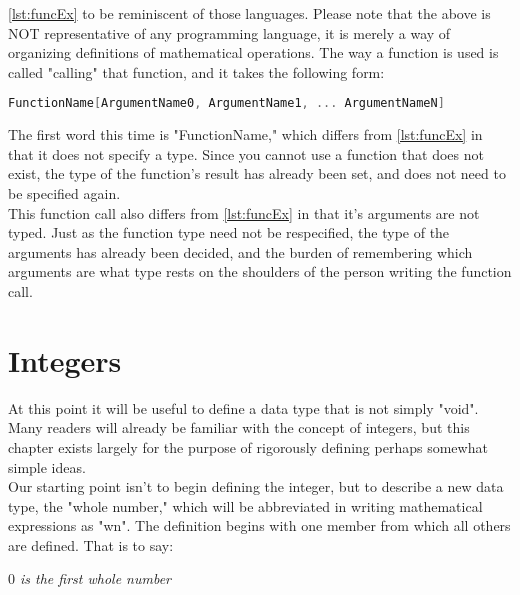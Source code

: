 \ref{lst:funcEx} to be reminiscent of those languages. Please note that the above is NOT representative of any programming language, it is merely a way of organizing definitions of mathematical operations.
The way a function is used is called "calling" that function, and it takes the following form:
\begin{center}
\begin{lstlisting}[language=C, caption=Function Call Example, label=lst:funcCallEx]
FunctionName[ArgumentName0, ArgumentName1, ... ArgumentNameN]
\end{lstlisting}
\end{center}
The first word this time is "FunctionName," which differs from \ref{lst:funcEx} in that it does not specify a type. Since you cannot use a function that does not exist, the type of the function's result has already been set, and does not need to be specified again. \\
This function call also differs from \ref{lst:funcEx} in that it's arguments are not typed. Just as the function type need not be respecified, the type of the arguments has already been decided, and the burden of remembering which arguments are what type rests on the shoulders of the person writing the function call.

\section{Integers}
At this point it will be useful to define a data type that is not simply "void". Many readers will already be familiar with the concept of integers, but this chapter exists largely for the purpose of rigorously defining perhaps somewhat simple ideas. \\
Our starting point isn't to begin defining the integer, but to describe a new data type, the "whole number," which will be abbreviated in writing mathematical expressions as "wn". The definition begins with one member from which all others are defined. That is to say:
\begin{center}
\textit{$0$ is the first whole number}
\end{center}

